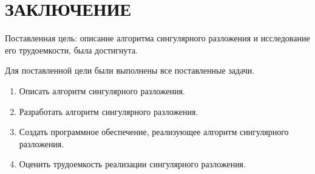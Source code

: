 \chapter*{\hfill{\centering  ЗАКЛЮЧЕНИЕ}\hfill}

Поставленная цель: описание алгоритма сингулярного разложения и исследование его трудоемкости, была достигнута.


Для поставленной цели были выполнены все поставленные задачи.
\begin{enumerate}
	\item Описать алгоритм сингулярного разложения.
	\item Разработать алгоритм сингулярного разложения.
	\item Создать программное обеспечение, реализующее алгоритм сингулярного разложения.
	\item Оценить трудоемкость реализации сингулярного разложения.
\end{enumerate}
